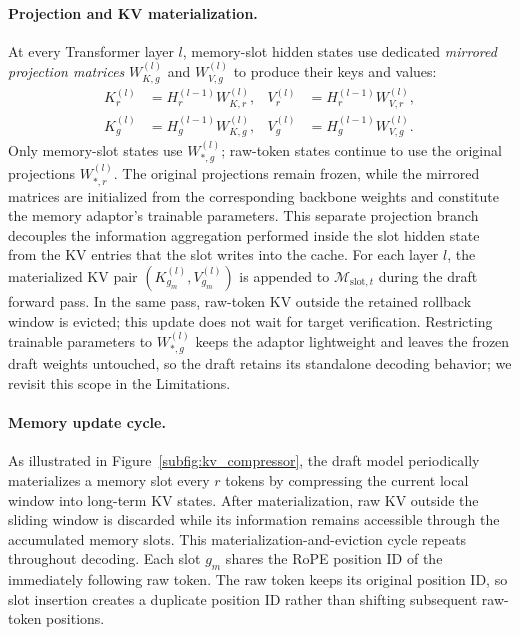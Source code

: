 \paragraph{Projection and KV materialization.}
At every Transformer layer $l$, memory-slot hidden states use dedicated \emph{mirrored projection matrices} $W_{K,g}^{(l)}$ and $W_{V,g}^{(l)}$ to produce their keys and values:
\begin{equation*}
    \begin{aligned}
        K_r^{(l)} &= H_r^{(l-1)}W_{K,r}^{(l)}, &
        V_r^{(l)} &= H_r^{(l-1)}W_{V,r}^{(l)}, \\
        K_g^{(l)} &= H_g^{(l-1)}W_{K,g}^{(l)}, &
        V_g^{(l)} &= H_g^{(l-1)}W_{V,g}^{(l)}.
    \end{aligned}
\end{equation*}
Only memory-slot states use $W_{\ast,g}^{(l)}$; raw-token states continue to use the original projections $W_{\ast,r}^{(l)}$.
The original projections remain frozen, while the mirrored matrices are initialized from the corresponding backbone weights and constitute the memory adaptor's trainable parameters.
This separate projection branch decouples the information aggregation performed inside the slot hidden state from the KV entries that the slot writes into the cache.
For each layer $l$, the materialized KV pair $(K_{g_m}^{(l)}, V_{g_m}^{(l)})$ is appended to $\mathcal{M}_{\mathrm{slot},t}$ during the draft forward pass.
In the same pass, raw-token KV outside the retained rollback window is evicted; this update does not wait for target verification.
Restricting trainable parameters to $W_{\ast,g}^{(l)}$ keeps the adaptor lightweight and leaves the frozen draft weights untouched, so the draft retains its standalone decoding behavior; we revisit this scope in the Limitations.

\paragraph{Memory update cycle.}
As illustrated in Figure~\ref{subfig:kv_compressor}, the draft model periodically materializes a memory slot every $r$ tokens by compressing the current local window into long-term KV states.
After materialization, raw KV outside the sliding window is discarded while its information remains accessible through the accumulated memory slots.
This materialization-and-eviction cycle repeats throughout decoding.
Each slot $g_m$ shares the RoPE position ID of the immediately following raw token.
The raw token keeps its original position ID, so slot insertion creates a duplicate position ID rather than shifting subsequent raw-token positions.

